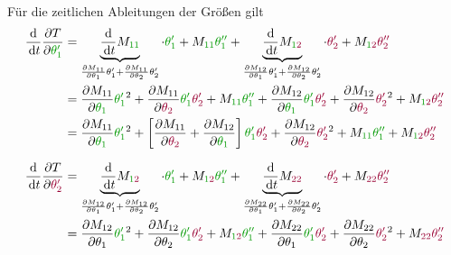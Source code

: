 \documentclass[a4paper, 12pt]{scrartcl}
\newcommand{\gruen}[2][gruen]{\textcolor{#1}{#2}}
\newcommand{\dunkelrot}[2][dunkelrot]{\textcolor{#1}{#2}}
\newcommand{\dt}{\thinspace \mathrm{d}t}
\begin{document}
Für die zeitlichen Ableitungen der Größen gilt 
\begin{align*}
    \frac{\mathrm{d}}{\dt} \frac{\partial T}{\partial \gruen{\theta_{1}'}} 
    &=
    \underbrace{
        \frac{\mathrm{d}}{\dt} M_{\gruen{1 1}}
    }_{
        \frac{\partial M_{11}}{\partial \theta_{1}} \theta_{1}' 
        + \frac{\partial M_{11}}{\partial \theta_{2}} \theta_{2}'
        } 
    \cdot \gruen{\theta_{1}'} + M_{\gruen{1 1}} \gruen{\theta_{1}''} + 
    \underbrace{
        \frac{\mathrm{d}}{\dt} M_{\gruen{1}\dunkelrot{2}}
        }_{
            \frac{\partial M_{12}}{\partial \theta_{1}} \theta_{1}' + \frac{\partial M_{12}}{\partial \theta_{2}} \theta_{2}'
            } 
        \cdot \dunkelrot{\theta_{2}'} + M_{\gruen{1}\dunkelrot{2}} \dunkelrot{\theta_{2}''} 
    \\
    &= \frac{\partial M_{11}}{\partial \gruen{\theta_{1}}} \gruen{\theta_{1}'}^2
    + \frac{\partial M_{11}}{\partial \dunkelrot{\theta_{2}}} \gruen{\theta_{1}'} \dunkelrot{ \theta_{2}'} 
    +  M_{\gruen{1 1}} \gruen{\theta_{1}''} 
    + \frac{\partial M_{12}}{\partial \gruen{\theta_{1}}} \gruen{\theta_{1}'} \dunkelrot{\theta_{2}'} 
    + \frac{\partial M_{12}}{\partial \dunkelrot{\theta_{2}}} \dunkelrot{\theta_{2}'}^2 
    + M_{\gruen{1}\dunkelrot{2}} \dunkelrot{\theta_{2}''} \\
    &=
    \frac{\partial M_{11}}{\partial \gruen{\theta_{1}}} \gruen{\theta_{1}'}^2
    + \left[ 
        \frac{\partial M_{11}}{\partial \dunkelrot{\theta_{2}}} + \frac{\partial M_{12}}{\partial \gruen{\theta_{1}}} 
        \right] 
    \gruen{\theta_{1}'} \dunkelrot{ \theta_{2}'} 
    + \frac{\partial M_{12}}{\partial \dunkelrot{\theta_{2}}} \dunkelrot{\theta_{2}'}^2 
    + M_{\gruen{1 1}} \gruen{\theta_{1}''} + M_{\gruen{1}\dunkelrot{2}} \dunkelrot{\theta_{2}''}
\end{align*}

\begin{align*}
\frac{\mathrm{d}}{\dt} \frac{\partial T}{\partial \dunkelrot{\theta_{2}'}} 
&=
\underbrace{\frac{\mathrm{d}}{\dt} M_{\gruen{1}\dunkelrot{2}}}_{\frac{\partial M_{12}}{\partial \theta_{1}} \theta_{1}' + \frac{\partial M_{12}}{\partial \theta_{2}} \theta_{2}'} \cdot \gruen{\theta_{1}'} + M_{\gruen{1}\dunkelrot{2}} \gruen{\theta_{1}''} + \underbrace{\frac{\mathrm{d}}{\dt} M_{\dunkelrot{22}}}_{\frac{\partial M_{22}}{\partial \theta_{1}} \theta_{1}' + \frac{\partial M_{22}}{\partial \theta_{2}} \theta_{2}'} \cdot \dunkelrot{\theta_{2}'} + M_{\dunkelrot{22}} \dunkelrot{\theta_{2}''} \\
&= 
\frac{\partial M_{12}}{\partial \theta_{1}}  \gruen{\theta_{1}'}^2 
 + \frac{\partial M_{12}}{\partial \theta_{2}} \gruen{\theta_{1}'} \dunkelrot{\theta_{2}'} 
 + M_{\gruen{1}\dunkelrot{2}} \gruen{\theta_{1}''}
 + \frac{\partial M_{22}}{\partial \theta_{1}} \gruen{\theta_{1}'} \dunkelrot{\theta_{2}'} 
 + \frac{\partial M_{22}}{\partial \theta_{2}}  \dunkelrot{\theta_{2}'}^2 
 + M_{\dunkelrot{22}} \dunkelrot{\theta_{2}''}
\end{align*}
\end{document}
